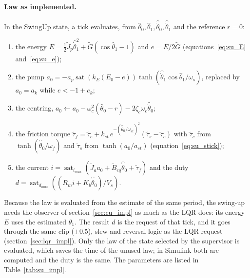 \documentclass[a4paper,11pt]{article}
\begin{document}
\paragraph{Law as implemented.} In the SwingUp state, a tick evaluates, from $\hat\theta_0, \hat\theta_1, \hat{\dot\theta}_0, \hat{\dot\theta}_1$ and the reference $r = 0$:
\begin{enumerate}
  \item the energy $E = \frac{1}{2}\tilde J_p\hat{\dot\theta}_1^2 + \tilde G(\cos\hat\theta_1 - 1)$ and $e = E/2\tilde G$ (equations~\ref{eq:su_E} and~\ref{eq:su_e});
  \item the pump $a_0 = -a_p\operatorname{sat}(k_E(E_0 - e))\tanh(\hat{\dot\theta}_1\cos\hat\theta_1/\omega_s)$, replaced by $a_0 = a_k$ while $e < -1 + e_k$;
  \item the centring, $a_0 \leftarrow a_0 - \omega_c^2(\hat\theta_0 - r) - 2\zeta_c\omega_c\hat{\dot\theta}_0$;
  \item the friction torque $\tilde\tau_f = \tilde\tau_c + k_{st}\,e^{-(\hat{\dot\theta}_0/\omega_{st})^2}(\tilde\tau_s - \tilde\tau_c)$ with $\tilde\tau_c$ from $\tanh(\hat{\dot\theta}_0/\omega_f)$ and $\tilde\tau_s$ from $\tanh(a_0/a_{st})$ (equation~\ref{eq:su_stick});
  \item the current $i = \operatorname{sat}_{i_{max}}(\tilde J_a a_0 + \tilde B_{eq}\hat{\dot\theta}_0 + \tilde\tau_f)$ and the duty $d = \operatorname{sat}_{d_{max}}((R_m i + K_b\hat{\dot\theta}_0)/V_s)$.
\end{enumerate}
Because the law is evaluated from the estimate of the same period, the swing-up needs the observer of section~\ref{sec:cu_impl} as much as the LQR does: its energy $E$ uses the estimated $\dot\theta_1$. The result $d$ is the request of that tick, and it goes through the same clip ($\pm0.5$), slew and reversal logic as the LQR request (section~\ref{sec:lqr_impl}). Only the law of the state selected by the supervisor is evaluated, which saves the time of the unused law; in Simulink both are computed and the duty is the same. The parameters are listed in Table~\ref{tab:su_impl}.
\end{document}
